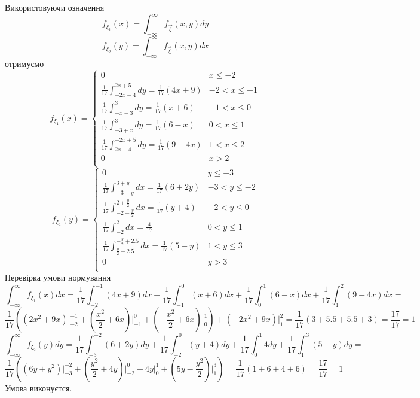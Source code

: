 \documentclass{article}
\begin{document}
	Використовуючи означення $$f_{\xi_1}(x) = \int_{-\infty}^{\infty}f_{\overrightarrow{\xi}}(x, y) dy$$
	$$f_{\xi_2}(y) = \int_{-\infty}^{\infty}f_{\overrightarrow{\xi}}(x, y) dx$$
	отримуємо 
	$$f_{\xi_1}(x) = 
	\begin{cases}
		0 & x \leq -2 \\
		\frac{1}{17}\int_{-2x-4}^{2x+5} dy = \frac{1}{17} (4x+9) & -2 < x \leq -1 \\
		\frac{1}{17}\int_{-x-3}^{3} dy = \frac{1}{17} (x + 6) & -1 < x \leq 0 \\
		\frac{1}{17}\int_{-3+x}^{3}dy = \frac{1}{17} (6-x) & 0 < x \leq 1 \\
		\frac{1}{17}\int_{2x-4}^{-2x+5}dy = \frac{1}{17} (9-4x) & 1 < x \leq 2 \\
		0 & x > 2 \\
	\end{cases}$$
		$$f_{\xi_2}(y) = 
	\begin{cases}
		0 & y \leq -3 \\
		\frac{1}{17}\int_{-3-y}^{3+y}dx = \frac{1}{17}(6+2y) & -3 < y \leq -2 \\
		\frac{1}{17}\int_{-2-\frac{y}{2}}^{2+\frac{y}{2}}dx = \frac{1}{17}(y+4) & -2 < y \leq 0 \\
		\frac{1}{17}\int_{-2}^{2}dx = \frac{4}{17} & 0 < y \leq 1 \\
		\frac{1}{17}\int_{\frac{y}{2}-2.5}^{-\frac{y}{2}+2.5}dx = \frac{1}{17}(5-y) & 1 < y \leq 3 \\
		0 & y > 3 \\
	\end{cases}
	$$
	Перевірка умови нормування
	\[
	\int_{-\infty}^{\infty} f_{\xi_1}(x) dx = \frac{1}{17}\int_{-2}^{-1}(4x+9)dx + 
	\frac{1}{17}\int_{-1}^{0} (x+6)dx + \frac{1}{17}\int_{0}^{1}(6-x)dx + \frac{1}{17}\int_{1}^{2}(9-4x)dx = 
	\]
	\[
	\frac{1}{17}((2x^2+9x)\Big|_{-2}^{-1} + (\frac{x^2}{2} + 6x)\Big|_{-1}^{0} + (-\frac{x^2}{2} + 6x)\Big|_0^1) + (-2x^2+9x)\Big|_{1}^{2} = \frac{1}{17}(3+5.5 + 5.5 + 3) = \frac{17}{17} = 1
	\]
	\bigskip
	\[
	\int_{-\infty}^{\infty} f_{\xi_2}(y) dy = \frac{1}{17}\int_{-3}^{-2}(6+2y)dy + \frac{1}{17}\int_{-2}^{0}(y+4)dy + \frac{1}{17}\int_{0}^{1}4dy + \frac{1}{17}\int_1^3(5-y)dy =
	\]
	\[
	\frac{1}{17}((6y+y^2)\Big|_{-3}^{-2} + (\frac{y^2}{2} + 4y)\Big|_{-2}^{0} + 4y\Big|_{0}^{1} + (5y-\frac{y^2}{2})\Big|_1^3) = \frac{1}{17}(1+6+4+6) = \frac{17}{17} = 1 
	\]
	Умова виконуєтся.
\end{document}
